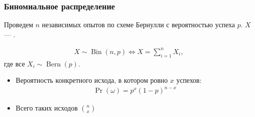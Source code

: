 \documentclass[hyperref=unicode,graphics=pdflatex,13pt,xcolor={usenames,dvipsnames}]{beamer}
\renewcommand\emph[1]{{\color{blue}{#1}}}
\DeclareMathOperator{\Bin}{Bin}
\DeclareMathOperator{\Bern}{Bern}
\begin{document}
\begin{frame}
  \frametitle{Биномиальное распределение}
  Проведем $n$ независимых опытов по схеме Бернулли с вероятностью успеха $p$. $X$ --- \emph{число успехов}.

  \begin{align*}
    X \sim \Bin(n, p) \Leftrightarrow X = \sum_{i = 1}^n X_i,
  \end{align*}
  где все $X_i \sim \Bern(p)$.
  
  \pause

  \begin{center}
  \end{center}

  \pause
  \begin{itemize}
    \item Вероятность конкретного исхода, в котором ровно $x$ успехов:
    \begin{align*}
      \Pr(\omega) = p^x (1 - p)^{n - x}
    \end{align*}
    \item Всего таких исходов $\binom{n}{x}$ 
  \end{itemize}
\end{frame}
\end{document}
